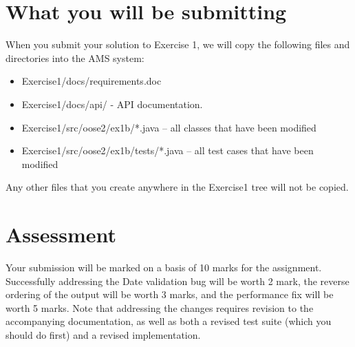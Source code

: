 \documentclass[12pt,a4paper]{article}
\begin{document}
\section{What you will be submitting}
When you submit your solution to Exercise 1, we will copy the
following files and directories into the AMS system:

\begin{itemize}
\item Exercise1/docs/requirements.doc
\item Exercise1/docs/api/ - API documentation.
\item Exercise1/src/oose2/ex1b/*.java – all classes that have
  been modified
\item Exercise1/src/oose2/ex1b/tests/*.java – all test cases
  that have been modified
\end{itemize}

Any other files that you create anywhere in the Exercise1 tree will
not be copied.

\section{Assessment}

Your submission will be marked on a basis of 10 marks for the
assignment.  Successfully addressing the Date validation bug will be
worth 2 mark, the reverse ordering of the output will be worth 3
marks, and the performance fix will be worth 5 marks.  Note that
addressing the changes requires revision to the accompanying
documentation, as well as both a revised test suite (which you should
do first) and a revised implementation.
\end{document}
